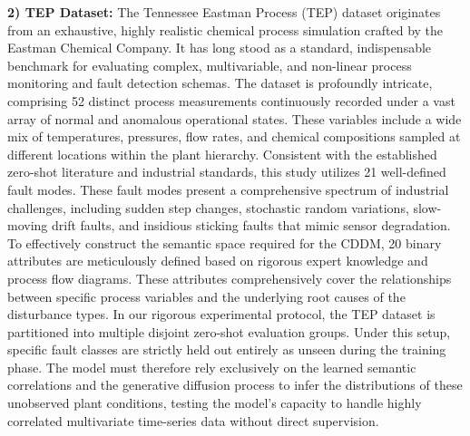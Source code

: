 \textbf{2) TEP Dataset:} The Tennessee Eastman Process (TEP) dataset originates from an exhaustive, highly realistic chemical process simulation crafted by the Eastman Chemical Company. It has long stood as a standard, indispensable benchmark for evaluating complex, multivariable, and non-linear process monitoring and fault detection schemas. The dataset is profoundly intricate, comprising 52 distinct process measurements continuously recorded under a vast array of normal and anomalous operational states. These variables include a wide mix of temperatures, pressures, flow rates, and chemical compositions sampled at different locations within the plant hierarchy. Consistent with the established zero-shot literature and industrial standards, this study utilizes 21 well-defined fault modes. These fault modes present a comprehensive spectrum of industrial challenges, including sudden step changes, stochastic random variations, slow-moving drift faults, and insidious sticking faults that mimic sensor degradation. To effectively construct the semantic space required for the CDDM, 20 binary attributes are meticulously defined based on rigorous expert knowledge and process flow diagrams. These attributes comprehensively cover the relationships between specific process variables and the underlying root causes of the disturbance types. In our rigorous experimental protocol, the TEP dataset is partitioned into multiple disjoint zero-shot evaluation groups. Under this setup, specific fault classes are strictly held out entirely as unseen during the training phase. The model must therefore rely exclusively on the learned semantic correlations and the generative diffusion process to infer the distributions of these unobserved plant conditions, testing the model's capacity to handle highly correlated multivariate time-series data without direct supervision.

